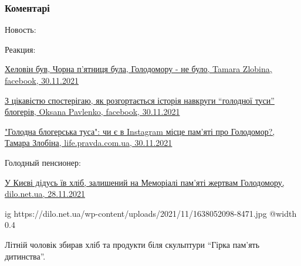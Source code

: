  
 
 
 
 
\subsubsection{Коментарі}
\label{sec:01_12_2021.fb.uljanov_anatolij.1.istoria_pro_zhabu_i_gadjuku.cmt}

\begin{itemize} %

Новость:


Реакция:

\href{https://www.facebook.com/tamara.zumka/posts/10227302865898844}{%
Хеловін був, Чорна п’ятниця була, Голодомору - не було, Tamara Zlobina, facebook, 30.11.2021%
}

\href{https://www.facebook.com/opavlenko/posts/10226952966598088}{%
З цікавістю спостерігаю, як розгортається історія навкруги \enquote{голодної туси} блогерів, %
Oksana Pavlenko, facebook, 30.11.2021%
}

\href{https://life.pravda.com.ua/columns/2021/11/30/246660/}{%
"Голодна блогерська туса": чи є в Instagram місце пам’яті про Голодомор?, Тамара Злобіна, life.pravda.com.ua, %
30.11.2021%
}

Голодный пенсионер:

\href{https://dilo.net.ua/novyny/u-kyyevi-didus-yiv-hlib-zalyshenyj-na-memoriali-pam-yati-zhertvam-golodomoru/}{%
У Києві дідусь їв хліб, залишений на Меморіалі пам’яті жертвам Голодомору, dilo.net.ua, 28.11.2021%
}


\begin{multicols}{2}

\ifcmt
  ig https://dilo.net.ua/wp-content/uploads/2021/11/1638052098-8471.jpg
  @width 0.4
\fi

Літній чоловік збирав хліб та продукти біля скульптури \enquote{Гірка пам’ять дитинства}.


\end{multicols}
\end{itemize}
